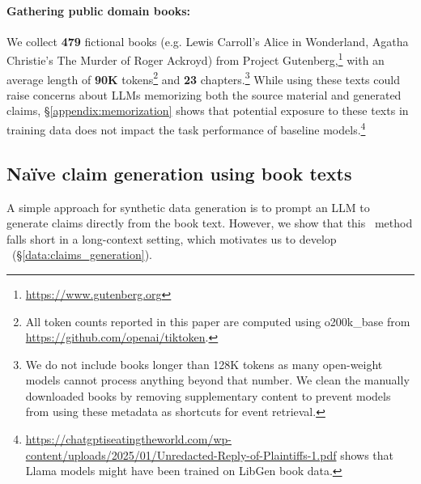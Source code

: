 \paragraph{Gathering public domain books:} We collect \textbf{479} fictional books (e.g. Lewis Carroll's Alice in Wonderland, Agatha Christie's The Murder of Roger Ackroyd) from Project Gutenberg,\footnote{\href{https://www.gutenberg.org}{https://www.gutenberg.org}} with an average length of \textbf{90K} tokens\footnote{All token counts reported in this paper are computed using o200k\_base from \url{https://github.com/openai/tiktoken}.} and \textbf{23} chapters.\footnote{We do not include books longer than 128K tokens as many open-weight models cannot process anything beyond that number. We clean the manually downloaded books by removing supplementary content to prevent models from using these metadata as shortcuts for event retrieval.} While using these texts could raise concerns about LLMs memorizing both the source material and generated claims, \S\ref{appendix:memorization} shows that potential exposure to these texts in training data does not impact the task performance of baseline models.\footnote{\href{https://chatgptiseatingtheworld.com/wp-content/uploads/2025/01/Unredacted-Reply-of-Plaintiffs-1.pdf}{https://chatgptiseatingtheworld.com/wp-content/uploads/2025/01/Unredacted-Reply-of-Plaintiffs-1.pdf} shows that Llama models might have been trained on LibGen book data.}



\subsection{Na\"ive claim generation using book texts}
\label{data:alt}
A simple approach for synthetic data generation is to prompt an LLM to generate claims directly from the book text. However, we show that this \naive\ method falls short in a long-context setting, which motivates us to develop \pipeline\ (\S\ref{data:claims_generation}).

